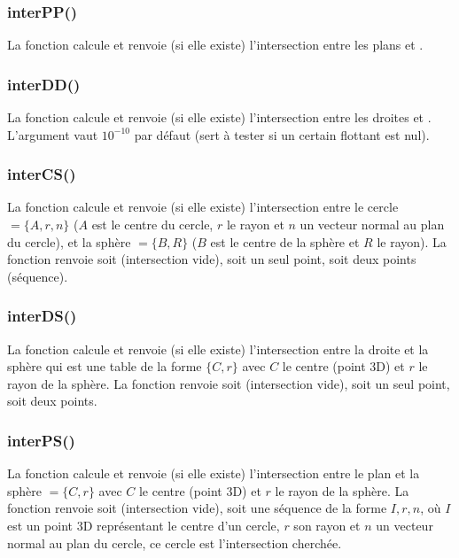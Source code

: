 \subsubsection{interPP()}

La fonction  calcule et renvoie (si elle existe) l'intersection entre les plans  et .

\subsubsection{interDD()}

La fonction  calcule et renvoie (si elle existe) l'intersection entre les droites  et . L'argument  vaut $10^{-10}$ par défaut (sert à tester si un certain flottant est nul).

\subsubsection{interCS()}

La fonction  calcule et renvoie (si elle existe) l'intersection entre le cercle $=\{A,r,n\}$ ($A$ est le centre du cercle, $r$ le rayon et $n$ un vecteur normal au plan du cercle), et la sphère $=\{B,R\}$ ($B$ est le centre de la sphère et $R$ le rayon). La fonction renvoie soit \nil (intersection vide), soit un seul point, soit deux points (séquence).

\subsubsection{interDS()}

La fonction  calcule et renvoie (si elle existe) l'intersection entre la droite  et la sphère  qui est une table de la forme $\{C,r\}$ avec $C$ le centre (point 3D) et $r$ le rayon de la sphère. La fonction renvoie soit \nil (intersection vide), soit un seul point, soit deux points.

\subsubsection{interPS()}

La fonction  calcule et renvoie (si elle existe) l'intersection entre le plan  et la sphère $=\{C,r\}$ avec $C$ le centre (point 3D) et $r$ le rayon de la sphère. La fonction renvoie soit \nil (intersection vide), soit une séquence de la forme $I,r,n$, où $I$ est un point 3D représentant le centre d'un cercle, $r$ son rayon et $n$ un vecteur normal au plan du cercle, ce cercle est l'intersection cherchée. 

